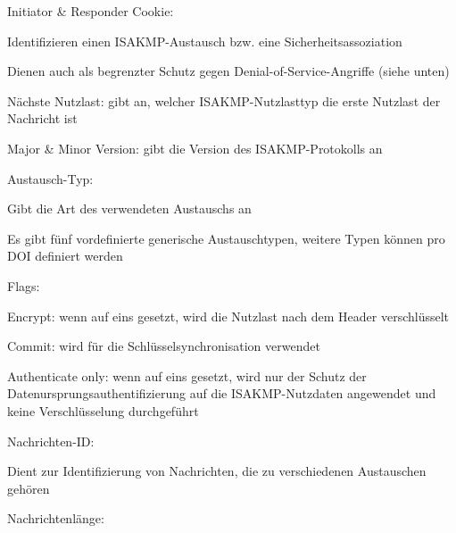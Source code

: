 \documentclass[a4paper]{article}
\begin{document}
\begin{multicols}{3}
      \begin{itemize*}
            \item %
            \item Initiator \& Responder Cookie:
            \begin{itemize*}
                  \item Identifizieren einen ISAKMP-Austausch bzw. eine Sicherheitsassoziation
                  \item Dienen auch als begrenzter Schutz gegen Denial-of-Service-Angriffe (siehe unten)
            \end{itemize*}
            \item Nächste Nutzlast: gibt an, welcher ISAKMP-Nutzlasttyp die erste
            Nutzlast der Nachricht ist
            \item Major \& Minor Version: gibt die Version des ISAKMP-Protokolls an
            \item Austausch-Typ:
            \begin{itemize*}
                  \item Gibt die Art des verwendeten Austauschs an
                  \item Es gibt fünf vordefinierte generische Austauschtypen, weitere Typen können pro DOI definiert werden
            \end{itemize*}
            \item Flags:
            \begin{itemize*}
                  \item Encrypt: wenn auf eins gesetzt, wird die Nutzlast nach dem Header verschlüsselt
                  \item Commit: wird für die Schlüsselsynchronisation verwendet
                  \item Authenticate only: wenn auf eins gesetzt, wird nur der Schutz der Datenursprungsauthentifizierung auf die ISAKMP-Nutzdaten angewendet und keine Verschlüsselung durchgeführt
            \end{itemize*}
            \item Nachrichten-ID:
            \begin{itemize*}
                  \item Dient zur Identifizierung von Nachrichten, die zu verschiedenen Austauschen gehören
            \end{itemize*}
            \item Nachrichtenlänge:
            \begin{itemize*}

\end{itemize*}
\end{itemize*}
\end{multicols}
\end{document}
